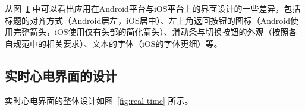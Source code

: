 \begin{figure}[h]
    \label{fig:android-ios}
\end{figure}

从图~\ref{fig:android-ios} 中可以看出应用在Android平台与iOS平台上的界面设计的一些差异，包括标题的对齐方式（Android居左，iOS居中）、左上角返回按钮的图标（Android使用完整箭头，iOS使用仅有头部的简化箭头）、滑动条与切换按钮的外观（按照各自规范中的相关要求）、文本的字体（iOS的字体更细）等。

\subsection{实时心电界面的设计}\label{subsec:real-time-design}

实时心电界面的整体设计如图~\ref{fig:real-time} 所示。

